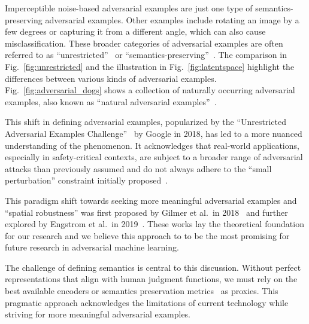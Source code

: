 \documentclass[a4paper, oneside]{discothesis}
\begin{document}
Imperceptible noise-based adversarial examples are just one type of semantics-preserving adversarial examples. Other examples include rotating an image by a few degrees or capturing it from a different angle, which can also cause misclassification. These broader categories of adversarial examples are often referred to as ``unrestricted''~\cite{fazlija2024real, brown2018unrestricted} or ``semantics-preserving''~\cite{browne2020semantics, careil2023towards, lee2020semantics}. The comparison in Fig.~\ref{fig:unrestricted} and the illustration in Fig.~\ref{fig:latentspace} highlight the differences between various kinds of adversarial examples. Fig.~\ref{fig:adversarial_dogs} shows a collection of naturally occurring adversarial examples, also known as ``natural adversarial examples''~\cite{hendrycks2021natural, teenybiscuittweet}.

This shift in defining adversarial examples, popularized by the ``Unrestricted Adversarial Examples Challenge''~\cite{brown2018unrestricted} by Google in 2018, has led to a more nuanced understanding of the phenomenon. It acknowledges that real-world applications, especially in safety-critical contexts, are subject to a broader range of adversarial attacks than previously assumed and do not always adhere to the ``small perturbation'' constraint initially proposed~\cite{brown2018unrestricted}.

This paradigm shift towards seeking more meaningful adversarial examples and ``spatial robustness'' was first proposed by Gilmer et al.\ in 2018~\cite{gilmer2018motivating} and further explored by Engstrom et al.\ in 2019~\cite{engstrom2019exploring}. These works lay the theoretical foundation for our research and we believe this approach to to be the most promising for future research in adversarial machine learning.

The challenge of defining semantics is central to this discussion. Without perfect representations that align with human judgment functions, we must rely on the best available encoders or semantics preservation metrics~\cite{engstrom2019exploring, herel2023preserving} as proxies. This pragmatic approach acknowledges the limitations of current technology while striving for more meaningful adversarial examples.
\end{document}
